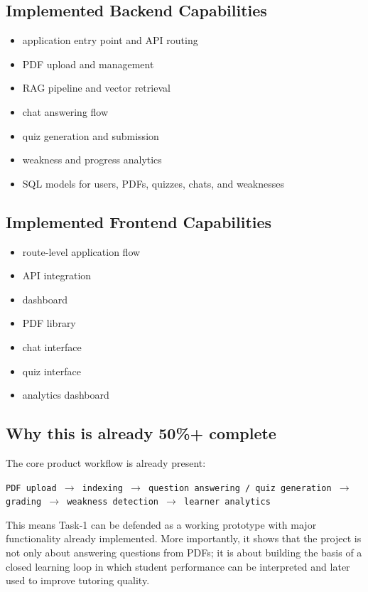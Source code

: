 \documentclass[11pt,a4paper]{article}
\begin{document}
\subsection{Implemented Backend Capabilities}
\begin{itemize}
    \item application entry point and API routing
    \item PDF upload and management
    \item RAG pipeline and vector retrieval
    \item chat answering flow
    \item quiz generation and submission
    \item weakness and progress analytics
    \item SQL models for users, PDFs, quizzes, chats, and weaknesses
\end{itemize}

\subsection{Implemented Frontend Capabilities}
\begin{itemize}
    \item route-level application flow
    \item API integration
    \item dashboard
    \item PDF library
    \item chat interface
    \item quiz interface
    \item analytics dashboard
\end{itemize}

\subsection{Why this is already 50\%+ complete}
The core product workflow is already present:

\begin{center}
\texttt{PDF upload $\rightarrow$ indexing $\rightarrow$ question answering / quiz generation $\rightarrow$ grading $\rightarrow$ weakness detection $\rightarrow$ learner analytics}
\end{center}

This means Task-1 can be defended as a working prototype with major functionality already implemented. More importantly, it shows that the project is not only about answering questions from PDFs; it is about building the basis of a closed learning loop in which student performance can be interpreted and later used to improve tutoring quality.
\end{document}
